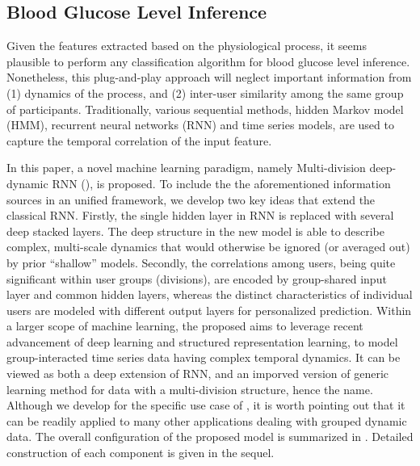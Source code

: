 \subsection{Blood Glucose Level Inference}
Given the features extracted based on the physiological process, it seems plausible to perform any classification algorithm for blood glucose level inference.
Nonetheless, this plug-and-play approach will neglect important information from (1) dynamics of the process, and (2) inter-user similarity among the same group of participants.
Traditionally, various sequential methods, \eg hidden Markov model (HMM), recurrent neural networks (RNN) and time series models, are used to capture the temporal correlation of the input feature.

In this paper, a novel machine learning paradigm, namely Multi-division deep-dynamic RNN (\modelname), is proposed.
To include the the aforementioned information sources in an unified framework, we develop two key ideas that extend the classical RNN.
Firstly, the single hidden layer in RNN is replaced with several deep stacked layers.
The deep structure in the new model is able to describe complex, multi-scale dynamics that would otherwise be ignored (or averaged out) by prior ``shallow'' models.
Secondly, the correlations among users, being quite significant within user groups (divisions), are encoded by group-shared input layer and common hidden layers, whereas the distinct characteristics of individual users are modeled with different output layers for personalized prediction.
Within a larger scope of machine learning, the proposed \modelname aims to leverage recent advancement of deep learning and structured representation learning, to model group-interacted time series data having complex temporal dynamics.
It can be viewed as both a deep extension of RNN, and an imporved version of generic learning method for data with a multi-division structure, hence the name.
Although we develop \modelname for the specific use case of \sysname, it is worth pointing out that it can be readily applied to many other applications dealing with grouped dynamic data.
The overall configuration of the proposed model is summarized in .
Detailed construction of each component is given in the sequel.


